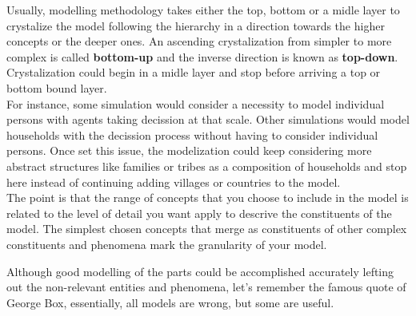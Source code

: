 \documentclass[11pt,oneside,a4paper,openright]{report}
\begin{document}
Usually, modelling methodology takes either the top, bottom or a midle layer to crystalize the model following the hierarchy in a direction towards the higher concepts or the deeper ones. An ascending crystalization from simpler to more complex is called \textbf{bottom-up} and the inverse direction is known as \textbf{top-down}. Crystalization could begin in a midle layer and stop before arriving a top or bottom bound layer.\\ 
For instance, some simulation would consider a necessity to model individual persons with agents taking decission at that scale. Other simulations would model households with the decission process without having to consider individual persons. Once set this issue, the modelization could keep considering more abstract structures like families or tribes as a composition of households and stop here instead of continuing adding villages or countries to the model.\\ 
The point is that the range of concepts that you choose to include in the model is related to the level of detail you want apply to descrive the constituents of the model. The simplest chosen concepts that merge as constituents of other complex constituents and phenomena mark the granularity of your model. 

% 
%

Although good modelling of the parts could be accomplished accurately lefting out the non-relevant entities and phenomena, let's remember the famous quote of George Box, essentially, all models are wrong, but some are useful.
\\
\end{document}
